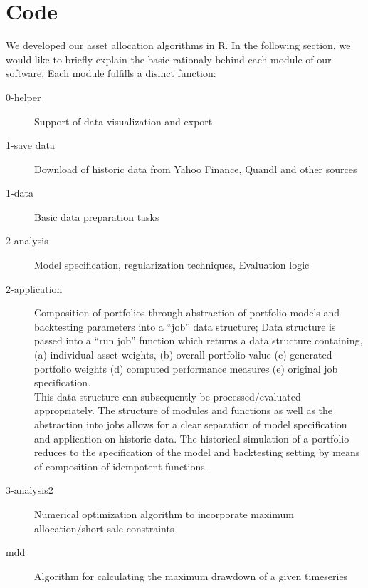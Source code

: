 \documentclass[11pt, parskip=full, DIV=14, headings=small, footsepline, footinclude=false, headsepline]{scrreprt}
\begin{document}
\chapter{Code}
We developed our asset allocation algorithms in R. In the following section, we would like to briefly explain the basic rationaly behind each module of our software. Each module fulfills a disinct function:
\begin{description}
  \item[0-helper] Support of data visualization and export
  \item[1-save data] Download of historic data from Yahoo Finance, Quandl and other sources
  \item[1-data] Basic data preparation tasks
  \item[2-analysis] Model specification, regularization techniques, Evaluation logic
  \item[2-application] Composition of portfolios through abstraction of portfolio models and backtesting parameters into a ``job'' data structure; Data structure is passed into a ``run job'' function which returns a data structure containing, (a) individual asset weights, (b) overall portfolio value (c) generated portfolio weights (d) computed performance measures (e) original job specification.\\
This data structure can subsequently be processed/evaluated appropriately. The structure of modules and functions as well as the abstraction into jobs allows for a clear separation of model specification and application on historic data. The historical simulation of a portfolio reduces to the specification of the model and backtesting setting by means of composition of idempotent functions.
  \item[3-analysis2] Numerical optimization algorithm to incorporate maximum allocation/short-sale constraints
  \item[mdd] Algorithm for calculating the maximum drawdown of a given timeseries
\end{description}














\end{document}
